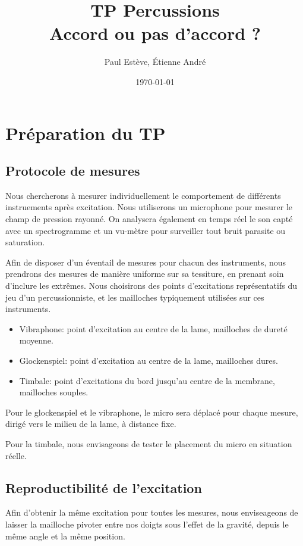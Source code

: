 \documentclass[atiam, article]{rapport} %
\title{TP Percussions\\Accord ou pas d'accord ?}
\author{Paul Estève, Étienne André} %
\date{\today}
\begin{document}
\maketitle

\section{Préparation du TP}

\subsection{Protocole de mesures}
Nous chercherons à mesurer individuellement le comportement de différents instruements après excitation. Nous utiliserons un microphone pour mesurer le champ de pression rayonné. On analysera également en temps réel le son capté avec un spectrogramme et un vu-mètre pour surveiller tout bruit parasite ou saturation.

Afin de disposer d'un éventail de mesures pour chacun des instruments, nous prendrons des mesures de manière uniforme sur sa tessiture, en prenant soin d'inclure les extrêmes. Nous choisirons des points d'excitations représentatifs du jeu d'un percussionniste, et les mailloches typiquement utilisées sur ces instruments.

\begin{itemize}
  \item Vibraphone: point d'excitation au centre de la lame, mailloches de dureté moyenne.
  \item Glockenspiel: point d'excitation au centre de la lame, mailloches dures.
  \item Timbale: point d'excitations du bord jusqu'au centre de la membrane, mailloches souples.
\end{itemize}


Pour le glockenspiel et le vibraphone, le micro sera déplacé pour chaque mesure, dirigé vers le milieu de la lame, à distance fixe.

Pour la timbale, nous envisageons de tester le placement du micro en situation réelle.

\subsection{Reproductibilité de l'excitation}
Afin d'obtenir la même excitation pour toutes les mesures, nous enviseageons de laisser la mailloche pivoter entre nos doigts sous l'effet de la gravité, depuis le même angle et la même position.
\end{document}

